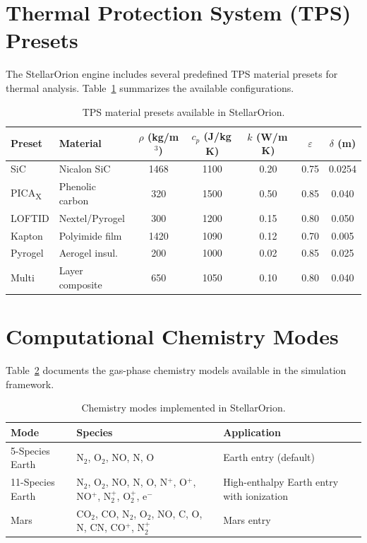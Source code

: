 \section{Thermal Protection System (TPS) Presets}
\label{sec:tps_presets}

The StellarOrion engine includes several predefined TPS material presets for thermal analysis. Table~\ref{tab:tps} summarizes the available configurations.

\begin{table}[H]
\centering
\caption{TPS material presets available in StellarOrion.}
\label{tab:tps}
\begin{tabular}{llccccc}
\hline
\textbf{Preset} & \textbf{Material} & $\rho$ (kg/m$^3$) & $c_p$ (J/kg\,K) & $k$ (W/m\,K) & $\varepsilon$ & $\delta$ (m) \\
\hline
SiC & Nicalon SiC & 1468 & 1100 & 0.20 & 0.75 & 0.0254 \\
PICA\textsubscript{X} & Phenolic carbon & 320 & 1500 & 0.50 & 0.85 & 0.040 \\
LOFTID & Nextel/Pyrogel & 300 & 1200 & 0.15 & 0.80 & 0.050 \\
Kapton & Polyimide film & 1420 & 1090 & 0.12 & 0.70 & 0.005 \\
Pyrogel & Aerogel insul.\ & 200 & 1000 & 0.02 & 0.85 & 0.025 \\
Multi & Layer composite & 650 & 1050 & 0.10 & 0.80 & 0.040 \\
\hline
\end{tabular}
\end{table}

\section{Computational Chemistry Modes}
\label{sec:chemistry_modes}

Table~\ref{tab:chemistry} documents the gas-phase chemistry models available in the simulation framework.

\begin{table}[H]
\centering
\caption{Chemistry modes implemented in StellarOrion.}
\label{tab:chemistry}
\begin{tabular}{lll}
\hline
\textbf{Mode} & \textbf{Species} & \textbf{Application} \\
\hline
5-Species Earth & N$_2$, O$_2$, NO, N, O & Earth entry (default) \\
11-Species Earth & N$_2$, O$_2$, NO, N, O, N$^+$, O$^+$, NO$^+$, N$_2^+$, O$_2^+$, e$^-$ & High-enthalpy Earth entry with ionization \\
Mars & CO$_2$, CO, N$_2$, O$_2$, NO, C, O, N, CN, CO$^+$, N$_2^+$ & Mars entry \\
\hline
\end{tabular}
\end{table}

